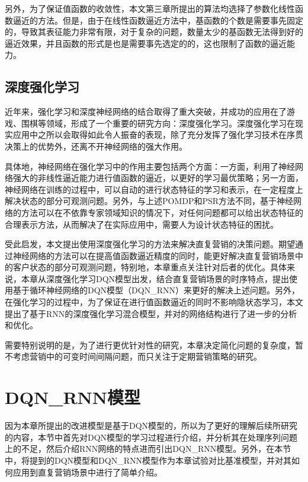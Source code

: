 另外，为了保证值函数的收敛性，本文第三章所提出的算法均选择了参数化线性函数逼近的方法。但是，由于在线性函数逼近方法中，基函数的个数是需要事先固定的，导致其表征能力非常有限，对于复杂的问题，数量太少的基函数无法得到好的逼近效果，并且函数的形式是也是需要事先选定的的，这也限制了函数的逼近能力。

\subsection{深度强化学习}
近年来，强化学习和深度神经网络的结合取得了重大突破，并成功的应用在了游戏、围棋等领域\citep{mnih2013playing, mnih2015human}，形成了一个重要的研究方向：深度强化学习。深度强化学习在现实应用中之所以会取得如此令人振奋的表现，除了充分发挥了强化学习技术在序贯决策上的优势外，还离不开神经网络的强大作用。

具体地，神经网络在强化学习中的作用主要包括两个方面：一方面，利用了神经网络强大的非线性逼近能力进行值函数的逼近，以更好的学习最优策略；另一方面，神经网络在训练的过程中，可以自动的进行状态特征的学习和表示，在一定程度上解决状态的部分可观测问题。另外，与上述POMDP和PSR方法不同，基于神经网络的方法可以在不依靠专家领域知识的情况下，对任何问题都可以给出状态特征的合理表示方法\citep{deng2014deep}，从而解决了在实际应用中，需要人为设计状态特征的困扰。

受此启发，本文提出使用深度强化学习的方法来解决直复营销的决策问题。期望通过神经网络的方法可以在提高值函数逼近精度的同时，能更好解决直复营销场景中的客户状态的部分可观测问题，特别地，本章重点关注针对后者的优化。具体来说，本章从深度强化学习DQN模型出发，结合直复营销场景的时序特点，提出使用基于循环神经网络的DQN模型（DQN_RNN）来更好的解决上述问题。另外，在强化学习的过程中，为了保证在进行值函数逼近的同时不影响隐状态学习，本文提出了基于RNN的深度强化学习混合模型，并对的网络结构进行了进一步的分析和优化。

需要特别说明的是，为了进行更优针对性的研究，本章决定简化问题的复杂度，暂不考虑营销中的可变时间间隔问题，而只关注于定期营销策略的研究。


\section{DQN_RNN模型}
因为本章所提出的改进模型是基于DQN模型的，所以为了更好的理解后续所研究的内容，本节中首先对DQN模型的学习过程进行介绍，并分析其在处理序列问题上的不足，然后介绍RNN网络的特点进而引出DQN_RNN模型。另外，在本节中，将提到的DQN模型和DQN_RNN模型作为本章试验对比基准模型，并对其如何应用到直复营销场景中进行了简单介绍。


